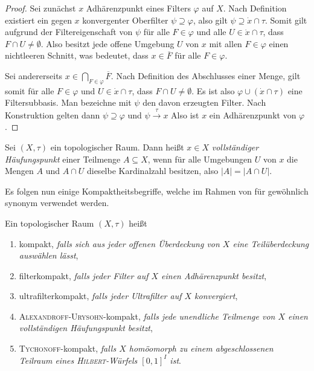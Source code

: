 \begin{proof}
  Sei zunächst $x$ Adhärenzpunkt eines Filters $\varphi$ auf $X$.
  Nach Definition existiert ein gegen $x$ konvergenter Oberfilter $\psi \supseteq \varphi$, also gilt $\psi \supseteq \dot x \cap \tau$.
  Somit gilt aufgrund der Filtereigenschaft von $\psi$ für alle $F \in \varphi$ und alle $U \in \dot x \cap \tau$, dass  $F \cap U \neq \emptyset$.
  Also besitzt jede offene Umgebung $U$ von $x$ mit allen $F \in \varphi$ einen nichtleeren Schnitt, was bedeutet, dass $x \in \overline F$ für alle $F  \in \varphi$.

  Sei andererseits $x \in \bigcap_{F \in \varphi} \overline F$.
  Nach Definition des Abschlusses einer Menge, gilt somit für alle $F \in \varphi$ und $U \in \dot x \cap \tau$, dass $F \cap U \neq \emptyset$.
  Es ist also $\varphi \cup (\dot x \cap \tau)$ eine Filtersubbasis.
  Man bezeichne mit $\psi$ den davon erzeugten Filter.
  Nach Konstruktion gelten dann $ \psi \supseteq \varphi $ und $ \psi \overset{\tau}{\to} x$
  Also ist $x$ ein Adhärenzpunkt von $\varphi$.
\end{proof}

\begin{defn}
  Sei $(X,\tau)$ ein topologischer Raum.
  Dann heißt $x \in X$ \textit{vollständiger Häufungspunkt} einer Teilmenge $A \subseteq X$, wenn für alle Umgebungen $U$ von $x$ die Mengen $A$ und $A \cap U$ dieselbe Kardinalzahl besitzen, also $|A| = | A \cap U |$.
\end{defn}

Es folgen nun einige Kompaktheitsbegriffe, welche im Rahmen von \ZFC für gewöhnlich synonym verwendet werden.
\begin{defn}
  Ein topologischer Raum $(X,\tau)$ heißt
  \begin{enumerate}[(1)]
    \item kompakt, \textit{falls sich aus jeder offenen Überdeckung von $X$ eine Teilüberdeckung auswählen lässt},
    \item filterkompakt, \textit{falls jeder Filter auf $X$ einen Adhärenzpunkt besitzt},
    \item ultrafilterkompakt, \textit{falls jeder Ultrafilter auf $X$ konvergiert},
    \item \textsc{Alexandroff}-\textsc{Urysohn}-kompakt, \textit{falls jede unendliche Teilmenge von $X$ einen vollständigen Häufungspunkt besitzt},
    \item \textsc{Tychonoff}-kompakt, \textit{falls $X$ homöomorph zu einem abgeschlossenen Teilraum eines \textsc{Hilbert}-Würfels $[0,1]^I$ ist}.
  \end{enumerate}
\end{defn}

